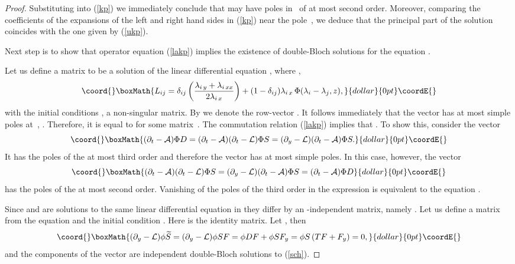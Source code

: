 \documentclass[a4paper,11pt]{article}
\providecommand{\p}{\partial}
\providecommand{\wt}{\widetilde}
\providecommand{\cL}{{\cal L}}
\providecommand{\cA}{{\cal A}}
\theoremstyle{plain}
\theoremstyle{remark}
\begin{document}
\begin{proof}
Substituting \coordHE{} into (\ref{kp}) we immediately conclude that \coordHE{} may have poles
in~\myHighlight{$\lambda$}\coordHE{} of at most second order. Moreover, comparing the coefficients
of the expansions of the left and right hand sides in (\ref{kp}) near the
pole~\coordHE{}, we deduce that the principal part of the solution~\coordHE{} coincides
with the one given by (\ref{ukp}).

Next step is to show that operator equation (\ref{lakp}) implies
the existence of double-Bloch solutions for the equation
\myHighlight{$(\p_y-\cL)\psi(x,y,t,\lambda)=0$}\coordHE{}.

Let us define a matrix \coordHE{} to be a solution of the linear differential
equation \myHighlight{$\p_x S=L S$}\coordHE{}, where \coordHE{},
$$\coord{}\boxMath{
L_{ij} =\delta_{ij}\left(
\frac{\lambda_{i\,y}+\lambda_{i\,xx}}{2\lambda_{i\,x}}
\right)+(1-\delta_{ij}) \lambda_{i\,x}\, \Phi(\lambda_i-\lambda_j,z) ,
}{dollar}{0pt}\coordE{}$$
with the initial conditions \coordHE{}, a non-singular matrix.
By \myHighlight{$\Phi$}\coordHE{} we denote the row-vector
\coordHE{}.
It follows immediately that the vector \myHighlight{$(\p_y-\cL)\Phi S$}\coordHE{} has at most simple
poles at~\coordHE{}, \coordHE{}. Therefore, it is equal to \coordHE{} for
some matrix~\coordHE{}. The commutation relation (\ref{lakp}) implies that
\coordHE{}. To show this, consider the vector
$$\coord{}\boxMath{
(\p_t-\cA)\Phi D=(\p_t-\cA)(\p_t-\cL)\Phi S=(\p_y-\cL)(\p_t-\cA)\Phi S.
}{dollar}{0pt}\coordE{}$$
It has the poles of the at most third order and therefore the vector
\myHighlight{$(\p_t-\cA)\phi S$}\coordHE{} has at most simple poles. In this case, however, the vector
$$\coord{}\boxMath{
(\p_t-\cA)(\p_t-\cL)\Phi S=(\p_y-\cL)(\p_t-\cA)\Phi S=(\p_t-\cA)\Phi D
}{dollar}{0pt}\coordE{}$$
has the poles of the at most second order. Vanishing of the poles of the third order
in the expression \myHighlight{$(\p_t-\cA)\Phi D$}\coordHE{} is equivalent to the equation \coordHE{}.

Since \coordHE{} and \coordHE{} are solutions to the same linear differential equation in \coordHE{} they
differ by an \coordHE{}-independent matrix, namely \coordHE{}.
Let us define a matrix \coordHE{} from the equation \myHighlight{$\p_y F+T F=0$}\coordHE{} and the
initial condition \coordHE{}. Here \coordHE{} is the identity matrix.
Let \myHighlight{$\wt S=S F$}\coordHE{}, then
$$\coord{}\boxMath{
(\p_y-\cL)\phi\wt S=(\p_y-\cL)\phi S F=\phi D F+\phi S F_y=
\phi S\left(T F+F_y\right)=0,
}{dollar}{0pt}\coordE{}$$
and the components of the vector \myHighlight{$\phi\wt S$}\coordHE{} are independent double-Bloch solutions
to (\ref{sch}).


\end{proof}
\end{document}
